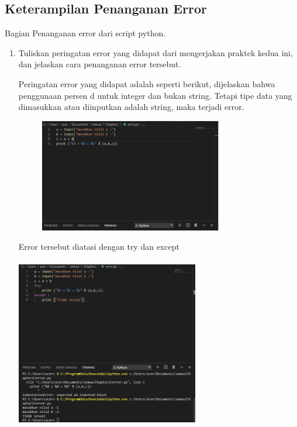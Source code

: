\documentclass{article}
\begin{document}
\begin{enumerate}
\section{Keterampilan Penanganan Error}
Bagian Penanganan error dari script python.
\begin{enumerate}
\item
Tuliskan peringatan error yang didapat dari mengerjakan praktek kedua ini, dan jelaskan cara penanganan error tersebut.
\par Peringatan error yang didapat adalah seperti berikut, dijelaskan bahwa penggunaan persen d untuk integer dan bukan string. Tetapi tipe data yang dimasukkan atau diinputkan adalah string, maka terjadi error.
\begin{figure}[h]
\newpage\centerline{\includegraphics[width=8cm]{figure/2.PNG}}
\end{figure}

\par Error tersebut diatasi dengan try dan except
\paragraph{}
\centerline{\includegraphics[width=8cm]{figure/1.PNG}}



\end{enumerate}
\end{enumerate}
\end{document}
